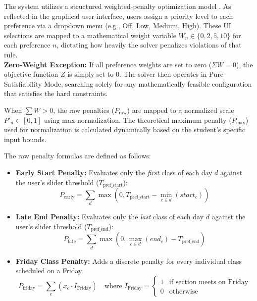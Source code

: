 \documentclass{icsthesis}
\begin{document}
\begin{mainmatter}
        The system utilizes a structured weighted-penalty optimization model \citep{rossi2006}. As reflected in the graphical user interface, users assign a priority level to each preference via a dropdown menu (e.g., Off, Low, Medium, High). These UI selections are mapped to a mathematical weight variable $W_n \in \{0, 2, 5, 10\}$ for each preference $n$, dictating how heavily the solver penalizes violations of that rule.\\

		\textbf{Zero-Weight Exception:} If all preference weights are set to zero ($\Sigma W = 0$), the objective function $Z$ is simply set to 0. The solver then operates in Pure Satisfiability Mode, searching solely for any mathematically feasible configuration that satisfies the hard constraints.

		When $\sum W > 0$, the raw penalties ($P_{\text{raw}}$) are mapped to a normalized scale $P'_n \in [0, 1]$ using max-normalization. The theoretical maximum penalty ($P_{\text{max}}$) used for normalization is calculated dynamically based on the student's specific input bounds.

		The raw penalty formulas are defined as follows:
		\begin{itemize}
			\item \textbf{Early Start Penalty:} Evaluates only the \textit{first} class of each day $d$ against the user's slider threshold ($T_{\text{pref\_start}}$):
			\begin{equation}
			P_{\text{early}} = \sum_{d} \max\left(0, T_{\text{pref\_start}} - \min_{c \in d}(start_c)\right)
			\end{equation}
			
			\item \textbf{Late End Penalty:} Evaluates only the \textit{last} class of each day $d$ against the user's slider threshold ($T_{\text{pref\_end}}$):
			\begin{equation}
			P_{\text{late}} = \sum_{d} \max\left(0, \max_{c \in d}(end_c) - T_{\text{pref\_end}}\right)
			\end{equation}
			
			\item \textbf{Friday Class Penalty:} Adds a discrete penalty for every individual class scheduled on a Friday:
			\begin{equation}
			P_{\text{friday}} = \sum_{c} (x_c \cdot I_{\text{Friday}}) \quad \text{where } I_{\text{Friday}} = \begin{cases} 1 & \text{if section meets on Friday} \\ 0 & \text{otherwise} \end{cases}
			\end{equation}


\end{itemize}
\end{mainmatter}
\end{document}
